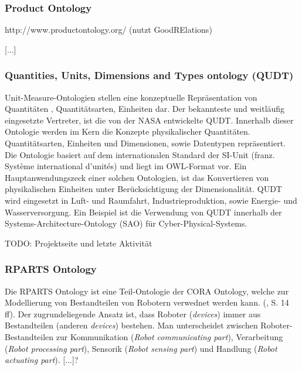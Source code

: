 \documentclass{article}
\begin{document}
\subsubsection{Product Ontology}

http://www.productontology.org/ (nutzt GoodRElations)

[...]

\subsubsection{Quantities, Units, Dimensions and Types ontology (QUDT)}

Unit-Measure-Ontologien stellen eine konzeptuelle Repräsentation von Quantitäten , Quantitätsarten, Einheiten dar. Der bekannteste und weitläufig eingesetzte Vertreter, ist die von der NASA entwickelte QUDT\cite{QUDTOntology}. Innerhalb dieser Ontologie werden im Kern die Konzepte physikalischer Quantitäten. Quantitätsarten, Einheiten und Dimensionen, sowie Datentypen repräsentiert. Die Ontologie basiert auf dem internationalen Standard der SI-Unit (franz. Système international d'unités) und liegt im OWL-Format vor. Ein Hauptanwendungszeck einer solchen Ontologien, ist das Konvertieren von physikalischen  Einheiten unter Berücksichtigung der Dimensionalität.
QUDT wird eingesetzt in Luft- und Raumfahrt, Industrieproduktion, sowie Energie- und Wasserversorgung. Ein Beispiel ist die Verwendung von QUDT innerhalb der Systems-Architecture-Ontology (SAO) für Cyber-Physical-Systems.

TODO: Projektseite und letzte Aktivität

\subsubsection{RPARTS Ontology}


Die RPARTS Ontology ist eine Teil-Ontologie der CORA Ontology, welche zur Modellierung von Bestandteilen von Robotern verwednet werden kann. (\cite{fiorini2015extensions}, S. 14 ff).
Der zugrundeliegende Ansatz ist, dass Roboter (\textit{devices}) immer aus Bestandteilen (anderen \textit{devices}) bestehen.
Man unterscheidet zwischen Roboter-Bestandteilen zur Kommunikation (\textit{Robot communicating part}), Verarbeitung (\textit{Robot processing part}), Sensorik (\textit{Robot sensing part}) und Handlung (\textit{Robot actuating part}).
[...]?
\end{document}
